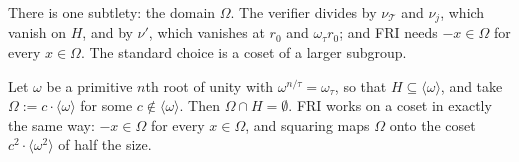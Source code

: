 \documentclass[../../book]{subfiles}
\begin{document}
There is one subtlety: the domain $\Omega$.
The verifier divides by $\nu_{\mathcal{T}}$ and $\nu_j$, which vanish on $H$, and by $\nu'$, which vanishes at $r_0$ and $\omega_\tau r_0$; and FRI needs $-x \in \Omega$ for every $x \in \Omega$.
The standard choice is a coset of a larger subgroup.

\begin{remark}\label{remark:stark-coset}
  Let $\omega$ be a primitive $n$th root of unity with $\omega^{n/\tau} = \omega_\tau$, so that $H \subseteq \langle \omega \rangle$, and take $\Omega := c \cdot \langle \omega \rangle$ for some $c \notin \langle \omega \rangle$.
  Then $\Omega \cap H = \emptyset$.
  FRI works on a coset in exactly the same way: $-x \in \Omega$ for every $x \in \Omega$, and squaring maps $\Omega$ onto the coset $c^2 \cdot \langle \omega^2 \rangle$ of half the size.
\end{remark}
\end{document}

